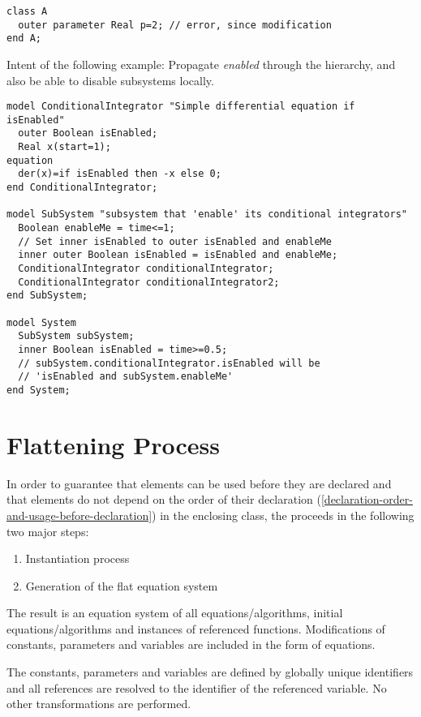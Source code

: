 \begin{example}
\begin{lstlisting}[language=modelica]
class A
  outer parameter Real p=2; // error, since modification
end A;
\end{lstlisting}

Intent of the following example: Propagate \emph{enabled} through
the hierarchy, and also be able to disable subsystems locally.
\begin{lstlisting}[language=modelica]
model ConditionalIntegrator "Simple differential equation if isEnabled"
  outer Boolean isEnabled;
  Real x(start=1);
equation
  der(x)=if isEnabled then -x else 0;
end ConditionalIntegrator;

model SubSystem "subsystem that 'enable' its conditional integrators"
  Boolean enableMe = time<=1;
  // Set inner isEnabled to outer isEnabled and enableMe
  inner outer Boolean isEnabled = isEnabled and enableMe;
  ConditionalIntegrator conditionalIntegrator;
  ConditionalIntegrator conditionalIntegrator2;
end SubSystem;

model System
  SubSystem subSystem;
  inner Boolean isEnabled = time>=0.5;
  // subSystem.conditionalIntegrator.isEnabled will be
  // 'isEnabled and subSystem.enableMe'
end System;
\end{lstlisting}
\end{example}

\section{Flattening Process}\label{flattening-process}

In order to guarantee that elements can be used before they are declared and that elements do not depend on the order of their declaration (\cref{declaration-order-and-usage-before-declaration}) in the enclosing class, the  proceeds in the following two major steps:
\begin{enumerate}
\item
  Instantiation process
\item
  Generation of the flat equation system
\end{enumerate}

The result is an equation system of all equations/algorithms, initial
equations/algorithms and instances of referenced functions.
Modifications of constants, parameters and variables are included in the
form of equations.

The constants, parameters and variables are defined by globally unique
identifiers and all references are resolved to the identifier of the
referenced variable. No other transformations are performed.

